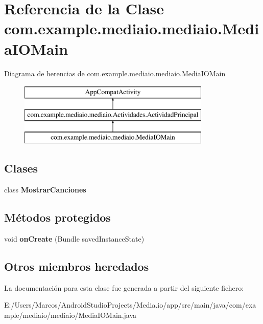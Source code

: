 \hypertarget{classcom_1_1example_1_1mediaio_1_1mediaio_1_1_media_i_o_main}{}\section{Referencia de la Clase com.\+example.\+mediaio.\+mediaio.\+Media\+I\+O\+Main}
\label{classcom_1_1example_1_1mediaio_1_1mediaio_1_1_media_i_o_main}
Diagrama de herencias de com.\+example.\+mediaio.\+mediaio.\+Media\+I\+O\+Main\begin{figure}[H]
\begin{center}
\leavevmode
\includegraphics[height=3.000000cm]{classcom_1_1example_1_1mediaio_1_1mediaio_1_1_media_i_o_main}
\end{center}
\end{figure}
\subsection*{Clases}
\begin{DoxyCompactItemize}
\item 
class {\bfseries Mostrar\+Canciones}
\end{DoxyCompactItemize}
\subsection*{Métodos protegidos}
\begin{DoxyCompactItemize}
\item 
\mbox{\label{classcom_1_1example_1_1mediaio_1_1mediaio_1_1_media_i_o_main_acb26bcbdec3a3c537c4d95a4f4caf07d}} 
void {\bfseries on\+Create} (Bundle saved\+Instance\+State)
\end{DoxyCompactItemize}
\subsection*{Otros miembros heredados}


La documentación para esta clase fue generada a partir del siguiente fichero\+:\begin{DoxyCompactItemize}
\item 
E\+:/\+Users/\+Marcos/\+Android\+Studio\+Projects/\+Media.\+io/app/src/main/java/com/example/mediaio/mediaio/Media\+I\+O\+Main.\+java\end{DoxyCompactItemize}
